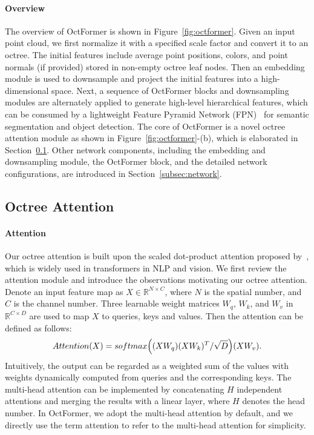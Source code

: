 \documentclass[acmtog,screen,authorversion]{acmart}
\begin{document}
\paragraph{Overview}
The overview of OctFormer is shown in Figure~\ref{fig:octformer}.
Given an input point cloud, we first normalize it with a specified scale factor and convert it to an octree.
The initial features include average point positions, colors, and point normals (if provided) stored in non-empty octree leaf nodes.
Then an embedding module is used to downsample and project the initial features into a high-dimensional space.
Next, a sequence of OctFormer blocks and downsampling modules are alternately applied to generate high-level hierarchical features, which can be consumed by a lightweight Feature Pyramid Network (FPN)~\cite{Lin2017,Kirillov2019} for semantic segmentation and object detection.
The core of OctFormer is a novel octree attention module as shown in Figure~\ref{fig:octformer}-(b), which is elaborated in Section~\ref{subsec:attention}.
Other network components, including the embedding and downsampling module, the OctFormer block, and the detailed network configurations, are introduced in Section~\ref{subsec:network}.


\subsection{Octree Attention} \label{subsec:attention}

\paragraph{Attention}
Our octree attention is built upon the scaled dot-product attention proposed by~\cite{Vaswani2017}, which is widely used in transformers in NLP and vision.
We first review the attention module and introduce the observations motivating our octree attention.
Denote an input feature map as $X \in \mathbb{R}^{N \times C}$, where $N$ is the spatial number, and $C$ is the channel number.
Three learnable weight matrices $W_q $, $W_k $, and $W_v$ in $\mathbb{R}^{C \times D}$ are used to map $X$ to queries, keys and values.
Then the attention can be defined as follows:
\begin{equation}
  Attention(X) = softmax \Bigl( (X W_q) (X W_k)^T / \sqrt{D} \Bigr) (X W_v) .
  \label{eq:attn}
\end{equation}
Intuitively, the output can be regarded as a weighted sum of the values with weights dynamically computed from queries and the corresponding keys.
The multi-head attention can be implemented by concatenating $H$ independent attentions and merging the results with a linear layer, where $H$ denotes the head number.
In OctFormer, we adopt the multi-head attention by default, and we
directly use the term attention to refer to the multi-head attention for simplicity.
\end{document}
